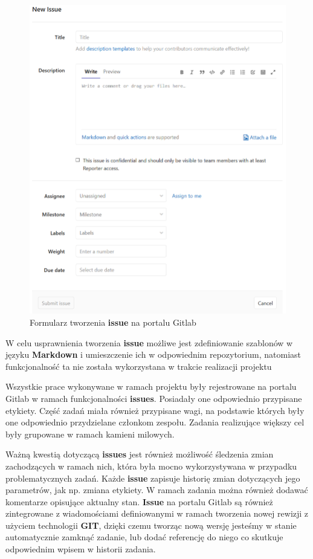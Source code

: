 \begin{figure}[H]
\centering
\caption{Formularz tworzenia \textbf{issue} na portalu Gitlab}
\label{fig:newIssue}
\includegraphics[width=\textwidth]{res/png/newIssue}
\end{figure}

W celu usprawnienia tworzenia \textbf{issue} możliwe jest zdefiniowanie szablonów w języku \textbf{Markdown} i umieszczenie ich w odpowiednim repozytorium, natomiast funkcjonalność ta nie została wykorzystana w trakcie realizacji projektu

\newpage

Wszystkie prace wykonywane w ramach projektu były rejestrowane na portalu Gitlab w ramach funkcjonalności \textbf{issues}. Posiadały one odpowiednio przypisane etykiety. Część zadań miała również przypisane wagi, na podstawie których były one odpowiednio przydzielane członkom zespołu. Zadania realizujące większy cel były grupowane w ramach kamieni milowych.

Ważną kwestią dotyczącą \textbf{issues} jest również możliwość śledzenia zmian zachodzących w ramach nich, która była mocno wykorzystywana w przypadku problematycznych zadań. Każde \textbf{issue} zapisuje historię zmian dotyczących jego parametrów, jak np. zmiana etykiety. W ramach zadania można również dodawać komentarze opisujące aktualny stan. \textbf{Issue} na portalu Gitlab są również zintegrowane z wiadomościami definiowanymi w ramach tworzenia nowej rewizji z użyciem technologii \textbf{GIT}, dzięki czemu tworząc nową wersję jesteśmy w stanie automatycznie zamknąć zadanie, lub dodać referencję do niego co skutkuje odpowiednim wpisem w historii zadania.

